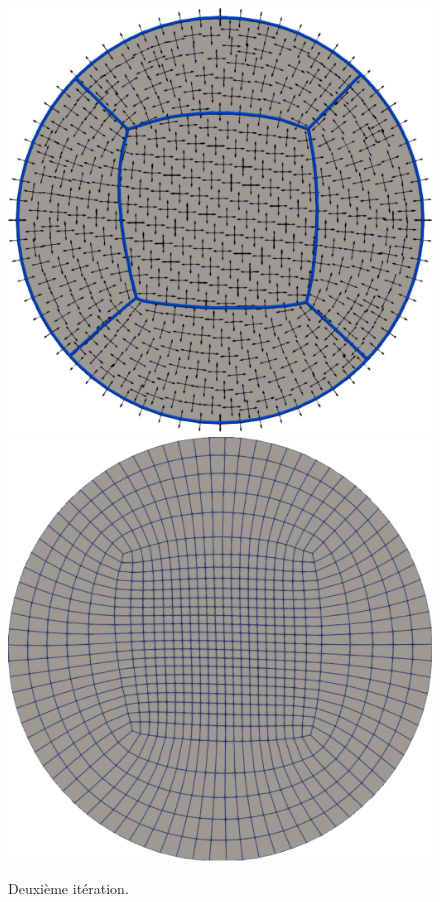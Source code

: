 \begin{figure}[h!]
\includegraphics[scale=0.27]{images/explosion_3.pdf}
\hfill
\includegraphics[scale=0.27]{images/explosion_4.pdf}
\caption{Deuxième itération.}
\label{fig:iteration_2}
\end{figure}

